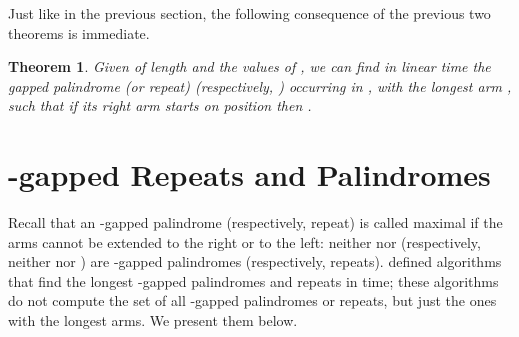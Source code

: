 \documentclass[final]{dmtcs-episciences}
\newtheorem{theorem}{Theorem}
\begin{document}
Just like in the previous section, the following consequence of the previous two theorems is immediate.

\begin{theorem}
Given  of length  and the values  of , we can find in linear time the gapped palindrome (or repeat)  (respectively, ) occurring in , with the longest arm , such that if its right arm starts on position  then . 
\end{theorem}

\section{-gapped Repeats and Palindromes}

Recall that an -gapped palindrome (respectively, repeat)  is called maximal if the arms cannot be extended to the right or to the left: neither  nor  (respectively, neither  nor ) are -gapped palindromes (respectively, repeats).
\cite{fct} defined algorithms that find the longest -gapped palindromes and repeats in  time; these algorithms do not compute the set of all -gapped palindromes or repeats, but just the ones with the longest arms. We present them below.
\end{document}
